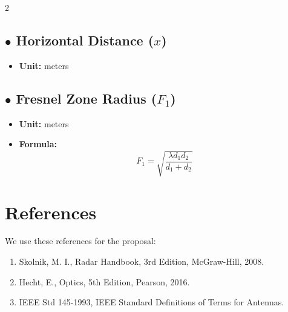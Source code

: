 \documentclass{article}
\begin{document}
\begin{multicols}{2}
	\subsection*{$\bullet$ Horizontal Distance ($x$)}
	\begin{itemize}
		\item \textbf{Unit:} meters
	\end{itemize}
	
	\subsection*{$\bullet$ Fresnel Zone Radius ($F_1$)}
	\begin{itemize}
		\item \textbf{Unit:} meters
		\item \textbf{Formula:} 
		\[
		F_1 = \sqrt{\frac{\lambda d_1 d_2}{d_1 + d_2}}
		\]
	\end{itemize}
\end{multicols}

\section{References}
We use these references for the proposal:
\begin{enumerate}
    \item Skolnik, M. I., Radar Handbook, 3rd Edition, McGraw-Hill, 2008.
    \item Hecht, E., Optics, 5th Edition, Pearson, 2016.
    \item IEEE Std 145-1993, IEEE Standard Definitions of Terms for Antennas.
\end{enumerate}
\end{document}
